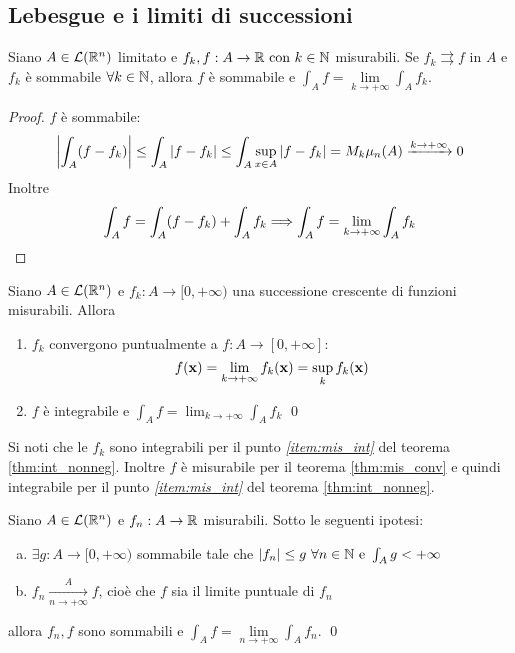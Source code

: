 \subsection{Lebesgue e i limiti di successioni}

\begin{theorem}
	Siano $A\in \mathcal{L}(\mathbb{R}^n)$ limitato e $f_k,f:A\to\mathbb{R} \text{ con } k \in \mathbb{N}$ misurabili. Se $f_k \rightrightarrows f$ in $A$ e $f_k$ è sommabile $\forall k \in \mathbb{N}$, allora $f$ è sommabile e $\displaystyle\int_A f = \lim\limits_{k\to+\infty}\int_Af_k$.
\end{theorem}

\begin{proof}
	$f$ è sommabile:
	$$\displaystyle\abs{\int_A (f-f_k)}\leq \int_A\abs{f-f_k}\leq \int_A\sup_{x \in A}\abs{f-f_k}=M_k\mu_n(A)\xrightarrow{k\to+\infty}0$$
	Inoltre
	$$
		\int_Af=\int_A(f-f_k)+\int_Af_k\Longrightarrow \int_Af=\lim_{k\to+\infty}\int_Af_k
	$$
\end{proof}

\begin{theorem}
	Siano $A \in \mathcal{L}(\mathbb{R}^n)$ e $f_k:A\to[0,+\infty)$ una successione crescente di funzioni misurabili. Allora
	\begin{enumerate}
		\item $f_k$ convergono puntualmente a $f: A\to[0,+\infty]$: $$f(\vb{x})=\lim\limits_{k\to+\infty}f_k(\vb{x})=\sup_kf_k(\vb{x})$$
		\item $f$ è integrabile e $\displaystyle\int_Af=\lim_{k\to+\infty}\int_Af_k$
		\qed
	\end{enumerate}
\end{theorem}

\begin{remark}
	Si noti che le $f_k$ sono integrabili per il punto \textit{\ref{item:mis_int}} del teorema \ref{thm:int_nonneg}. Inoltre $f$ è misurabile per il teorema \ref{thm:mis_conv} e quindi integrabile per il punto \textit{\ref{item:mis_int}} del teorema \ref{thm:int_nonneg}.
\end{remark}

\begin{theorem}
	Siano $A\in \mathcal{L}(\mathbb{R}^n)$ e $f_n:A\to\mathbb{R}$ misurabili. Sotto le seguenti ipotesi:
	\begin{enumerate}[a.]
		\item $\exists g:A\to[0,+\infty)$ sommabile tale che $\abs{f_n}\leq g\ \forall n \in \mathbb{N} \text{ e } \int_Ag<+\infty$
		\item $f_n\xrightarrow[n\to+\infty]{A}f$, cioè che $f$ sia il limite puntuale di $f_n$
	\end{enumerate}
	allora $f_n,f$ sono sommabili e $\displaystyle\int_Af=\lim\limits_{n\to+\infty}\int_Af_n$.
	\qed
\end{theorem}
